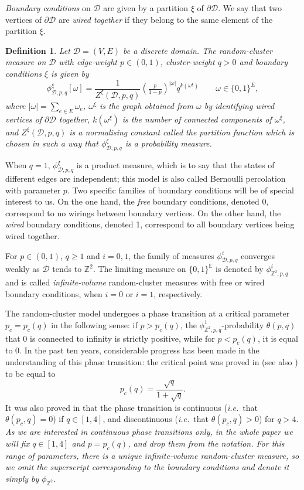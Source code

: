 \documentclass[a4paper,oneside,11pt]{article}
\newtheorem{definition}[theorem]{Definition}
\numberwithin{equation}{section}
\numberwithin{equation}{section}
\numberwithin{equation}{section}
\newcommand{\calD}{\mathcal{D}}
\newcommand{\bbE}{\mathbb{E}}
\newcommand{\bbZ}{\mathbb{Z}}
\begin{document}
{\em Boundary conditions} on $\calD$ are given by a partition $\xi$ of $\partial \calD$. We say that two vertices of $\partial \calD$ are {\em wired together} if they belong to the same element of the partition $\xi$.

\begin{definition}  Let $\mathcal D=(V,E)$ be a discrete domain. The random-cluster measure on $\calD$ with edge-weight $p \in (0,1)$, cluster-weight $q>0$ and boundary conditions $\xi$ is given by
\begin{equation}\label{eq:RCM_def1}
	\phi_{\calD,p,q}^\xi[\omega]=\frac{1}{Z^\xi(\calD,p,q)} (\tfrac{p}{1-p})^{|\omega|}q^{k(\omega^\xi)} \qquad  \omega\in \{0,1\}^{E},
\end{equation}
where $|\omega|=\sum_{e\in E}\omega_e$, 
$\omega^\xi$ is the graph obtained from $\omega$ by identifying wired vertices of $\partial \calD$ together, 
$k(\omega^\xi)$ is the number of connected components of $\omega^\xi$, 
and  $Z^\xi(\calD,p,q)$ is a normalising constant called the {\em partition function} which is chosen in such a way that $\phi_{\calD,p,q}^\xi$ is a probability measure. 
\end{definition}

When $q = 1$, $\phi_{\calD,p,q}^\xi$ is a product measure, which is to say that the states of different edges are independent; this model is also called Bernoulli percolation with parameter $p$.
Two specific families of boundary conditions will be of special interest to us. On the one hand, the {\em free} boundary conditions, denoted 0, correspond to no wirings between boundary vertices. On the other hand, the {\em wired} boundary conditions, denoted 1, correspond to all boundary vertices being wired together. 


For $p\in (0,1)$, $q\ge1$ and $i=0,1$, the family of measures $\phi_{\calD,p,q}^i$ converges weakly as $\calD$ tends to $\mathbb Z^2$. The limiting measure on $\{0,1\}^{\bbE}$ is denoted by $\phi_{\bbZ^2,p,q}^i$ and is called {\em infinite-volume} random-cluster measures with free or wired boundary conditions, when $i = 0$ or $i = 1$, respectively. 

The random-cluster model undergoes a phase transition at  a critical parameter $p_c=p_c(q)$  in the following sense: if $p>p_c(q)$, the $\phi_{\bbZ^2,p,q}^1$-probability $\theta(p,q)$
that 0 is connected to infinity
is strictly positive, while for $p<p_c(q)$, it is equal to 0.
In the past ten years, considerable progress has been made in the understanding of this phase transition: the critical point was proved in \cite{BefDum12} (see also \cite{DumRaoTas17,DumMan14,DCRT16}) to be equal to 
$$p_c(q)=\frac{\sqrt q}{1+\sqrt q}.$$
It was also proved in \cite{DumSidTas16,BetheAnsatz2,RaySpi19} that the phase transition is continuous (\emph{i.e.}~that $\theta(p_c,q)=0$) if $q\in[1,4]$, and discontinuous (\emph{i.e.}~that $\theta(p_c,q)>0$) for $q>4$. 
\bigbreak
{\em  As we are interested in continuous phase transitions only, in the whole paper we will fix  $q\in[1,4]$ and $p=p_c(q)$, and drop them from the notation. For this range of parameters, there is a unique infinite-volume random-cluster measure, so we omit the superscript corresponding to the boundary conditions and denote it simply  by $\phi_{\bbZ^2}$. }
\end{document}
